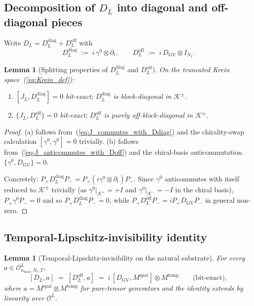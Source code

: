 \documentclass[11pt,a4paper]{article}
\theoremstyle{plain}
\newtheorem{lemma}[theorem]{Lemma}
\theoremstyle{definition}
\newcommand{\nmax}{n_{\max}}
\newcommand{\Nt}{N_{t}}
\newcommand{\Krein}{\mathcal{K}}
\newcommand{\Op}{\mathcal{O}}
\newcommand{\DGV}{D_{\mathrm{GV}}}
\newcommand{\DL}{D_{L}}
\newcommand{\Ddiag}{D_{L}^{\mathrm{diag}}}
\newcommand{\Doff}{D_{L}^{\mathrm{off}}}
\newcommand{\JL}{J_{L}}
\newcommand{\Pplus}{P_{+}}
\newcommand{\Pminus}{P_{-}}
\newcommand{\spat}{\mathrm{spat}}
\newcommand{\temp}{\mathrm{temp}}
\begin{document}
\subsection{Decomposition of $\DL$ into diagonal and off-diagonal pieces}
\label{sec:DL_decomposition}

Write $\DL = \Ddiag + \Doff$ with
\begin{equation}\label{eq:DL_split}
   \Ddiag \;:=\; i\,\gamma^{0} \otimes \partial_{t}, \qquad
   \Doff \;:=\; i\,\DGV \otimes I_{\Nt}.
\end{equation}

\begin{lemma}[Splitting properties of $\Ddiag$ and $\Doff$]
\label{lem:DL_splitting}
On the truncated Krein space~(\ref{eq:Krein_def}):
\begin{enumerate}
\item[(a)] $[\JL, \Ddiag] = 0$ bit-exact; $\Ddiag$ is block-diagonal in
$\Krein^{\pm}$.
\item[(b)] $\{\JL, \Doff\} = 0$ bit-exact; $\Doff$ is purely
off-block-diagonal in $\Krein^{\pm}$.
\end{enumerate}
\end{lemma}

\begin{proof}
(a) follows from~(\ref{eq:J_commutes_with_Ddiag}) and the chirality-swap
calculation $[\gamma^{0}, \gamma^{0}] = 0$ trivially. (b) follows
from~(\ref{eq:J_anticommutes_with_Doff}) and the chiral-basis
anticommutation $\{\gamma^{0}, \DGV\} = 0$.

Concretely: $\Pplus \Ddiag \Pminus = \Pplus (i\gamma^{0} \otimes \partial_{t})
\Pminus$. Since $\gamma^{0}$ anticommutes with itself reduced to
$\Krein^{\pm}$ trivially (as $\gamma^{0}|_{\Krein^{+}} = +I$ and
$\gamma^{0}|_{\Krein^{-}} = -I$ in the chiral basis), $\Pplus
\gamma^{0} \Pminus = 0$ and so $\Pplus \Ddiag \Pminus = 0$, while
$\Pplus \Doff \Pminus = i\Pplus \DGV \Pminus$ in general non-zero.
\qedhere
\end{proof}

\subsection{Temporal-Lipschitz-invisibility identity}
\label{sec:temporal_invisibility}

\begin{lemma}[Temporal-Lipschitz-invisibility on the natural substrate]
\label{lem:temporal_invisibility}
For every $a \in \Op^{L}_{\nmax, \Nt, T}$,
\begin{equation}\label{eq:temporal_invisibility}
   [\DL, a] \;=\; [\Doff, a] \;=\; i\,[\DGV, M^{\spat}] \otimes M^{\temp}
   \qquad \text{(bit-exact)},
\end{equation}
where $a = M^{\spat} \otimes M^{\temp}$ for pure-tensor generators and
the identity extends by linearity over $\Op^{L}$.
\end{lemma}
\end{document}
